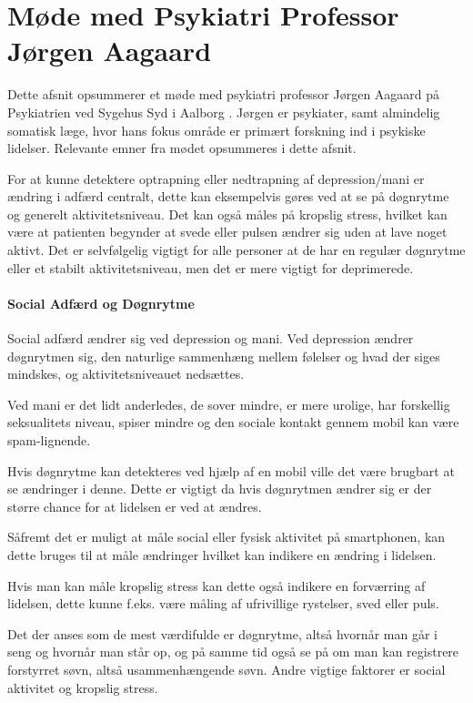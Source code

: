 \section{Møde med Psykiatri Professor Jørgen Aagaard}\label{sec:moede-med-joergen}
Dette afsnit opsummerer et møde med psykiatri professor Jørgen Aagaard på Psykiatrien ved Sygehus Syd i Aalborg \citep{misc:jorgen-aagaard}. 
Jørgen er psykiater, samt almindelig somatisk læge, hvor hans fokus område er primært forskning ind i psykiske lidelser.
Relevante emner fra mødet opsummeres i dette afsnit.

For at kunne detektere optrapning eller nedtrapning af depression/mani er ændring i adfærd centralt, dette kan eksempelvis gøres ved at se på døgnrytme og generelt aktivitetsniveau. 
Det kan også måles på kropslig stress, hvilket kan være at patienten begynder at svede eller pulsen ændrer sig uden at lave noget aktivt. 
Det er selvfølgelig vigtigt for alle personer at de har en regulær døgnrytme eller et stabilt aktivitetsniveau, men det er mere vigtigt for deprimerede.

\paragraph{Social Adfærd og Døgnrytme}
Social adfærd ændrer sig ved depression og mani.
Ved depression ændrer døgnrytmen sig, den naturlige sammenhæng mellem følelser og hvad der siges mindskes, og aktivitetsniveauet nedsættes.

Ved mani er det lidt anderledes, de sover mindre, er mere urolige, har forskellig seksualitets niveau, spiser mindre og den sociale kontakt gennem mobil kan være spam-lignende. 

Hvis døgnrytme kan detekteres ved hjælp af en mobil ville det være brugbart at se ændringer i denne.
Dette er vigtigt da hvis døgnrytmen ændrer sig er der større chance for at lidelsen er ved at ændres.

Såfremt det er muligt at måle social eller fysisk aktivitet på smartphonen, kan dette bruges til at måle ændringer hvilket kan indikere en ændring i lidelsen.

Hvis man kan måle kropslig stress kan dette også indikere en forværring af lidelsen, dette kunne f.eks. være måling af ufrivillige rystelser, sved eller puls. 

Det der anses som de mest værdifulde er døgnrytme, altså hvornår man går i seng og hvornår man står op, og på samme tid også se på om man kan registrere forstyrret søvn, altså usammenhængende søvn. 
Andre vigtige faktorer er social aktivitet og kropslig stress.

